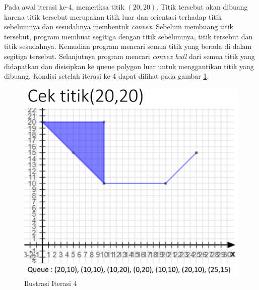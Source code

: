 \par Pada awal iterasi ke-4, memeriksa titik $(20,20)$. Titik tersebut akan dibuang karena titik tersebut merupakan titik luar dan orientasi terhadap titik sebelumnya dan sesudahnya membentuk \textit{convex}. Sebelum membuang titik tersebut, program membuat segitiga dengan titik sebelumnya, titik tersebut dan titik sesudahnya. Kemudian program mencari semua titik yang berada di dalam segitiga tersebut. Selanjutnya program mencari \textit{convex hull} dari semua titik yang didapatkan dan disisipkan ke queue polygon luar untuk menggantikan titik yang dibuang. Kondisi setelah iterasi ke-4 dapat dilihat pada gambar \ref{fig:iterasi-4}.
\begin{figure}[!h]
	\Centering
	\includegraphics [width=\columnwidth]{bab5/img/iterasi-4}
	\caption {Ilustrasi Iterasi 4}
	\label {fig:iterasi-4}
\end{figure}

